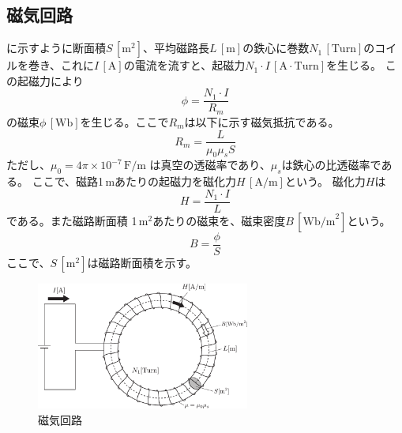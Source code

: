 \documentclass[11pt,dvipdfmx]{jarticle}
\begin{document}
\subsection{磁気回路}
に示すように断面積$S\,[\mathrm{m}^2]$、平均磁路長$L\,[\mathrm{m}]$の鉄心に巻数$N_1\,[\mathrm{Turn}]$のコイルを巻き、これに$I\,[\mathrm{A}]$の電流を流すと、起磁力$N_1\cdot I\,[\mathrm{A}\cdot\mathrm{Turn}]$を生じる。
この起磁力により
\begin{equation}
	\phi = \frac{N_1\cdot I}{R_m}
\end{equation}
の磁束$\phi\,[\mathrm{Wb}]$を生じる。ここで$R_m$は以下に示す磁気抵抗である。
\begin{equation}
	R_m= \frac{L}{\mu_0 \mu_s S}
\end{equation}
ただし、$\mu_0 = 4\pi\times 10^{-7}\,\mathrm{F/m}$ は真空の透磁率であり、$\mu_s$は鉄心の比透磁率である。
ここで、磁路1\,mあたりの起磁力を磁化力$H\,[\mathrm{A/m}]$という。 磁化力$H$は
\begin{equation}
	H=\frac{N_1\cdot I}{L}
\end{equation}
である。また磁路断面積 1\,m$^2$あたりの磁束を、磁束密度$B\,[\mathrm{Wb/m}^2]$という。
\begin{equation}
	B=\frac{\phi}{S}
	\label{eq:hys:BphiS}
\end{equation}
ここで、$S\,[\mathrm{m}^2]$は磁路断面積を示す。
\begin{figure}[htbp]
	\centering
	\includegraphics[width=70mm]{fig/magnetism_circuit.pdf}
	\caption{磁気回路}
	\label{fig:hys:jikikairo}
\end{figure}
\end{document}
